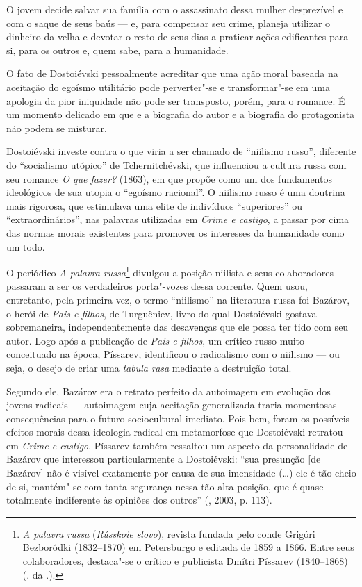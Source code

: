 {{O jovem decide salvar sua família com o assassinato dessa mulher
desprezível e com o saque de seus baús --- e, para compensar seu crime,
planeja utilizar o dinheiro da velha e devotar o resto de seus dias a
praticar ações edificantes para si, para os outros e, quem sabe, para a
humanidade.

O fato de Dostoiévski pessoalmente acreditar que uma ação moral baseada
na aceitação do egoísmo utilitário pode perverter"-se e transformar"-se em
uma apologia da pior iniquidade não pode ser transposto, porém, para o
romance. É um momento delicado em que e a biografia do autor e a
biografia do protagonista não podem se misturar.

Dostoiévski investe contra o que viria a ser chamado de ``niilismo
russo'', diferente do ``socialismo utópico'' de Tchernitchévski, que
influenciou a cultura russa com seu romance \emph{O que fazer?} (1863),
em que propõe como um dos fundamentos ideológicos de sua utopia o
``egoísmo racional''. O niilismo russo é uma doutrina mais rigorosa, que
estimulava uma elite de indivíduos ``superiores'' ou
``extraordinários'', nas palavras utilizadas em \emph{Crime e castigo},
a passar por cima das normas morais existentes para promover os
interesses da humanidade como um todo.

O periódico \emph{A palavra russa}\footnote{\emph{A palavra russa}
  (\emph{Rússkoie slovo}), revista fundada pelo conde Grigóri Bezboródki
  (1832--1870) em Petersburgo e editada de 1859 a 1866. Entre seus
  colaboradores, destaca"-se o crítico e publicista Dmítri Píssarev
  (1840--1868) (. da .).} divulgou a posição niilista e seus
colaboradores passaram a ser os verdadeiros porta"-vozes dessa corrente.
Quem usou, entretanto, pela primeira vez, o termo ``niilismo'' na
literatura russa foi Bazárov, o herói de \emph{Pais e filhos}, de
Turguêniev, livro do qual Dostoiévski gostava sobremaneira,
independentemente das desavenças que ele possa ter tido com seu autor.
Logo após a publicação de \emph{Pais e filhos}, um crítico russo muito
conceituado na época, Píssarev, identificou o radicalismo com o niilismo
--- ou seja, o desejo de criar uma \emph{tabula rasa} mediante a
destruição total.

Segundo ele, Bazárov era o retrato perfeito da autoimagem em evolução
dos jovens radicais --- autoimagem cuja aceitação generalizada traria
momentosas consequências para o futuro sociocultural imediato. Pois bem,
foram os possíveis efeitos morais dessa ideologia radical em metamorfose
que Dostoiévski retratou em \emph{Crime e castigo}. Píssarev também
ressaltou um aspecto da personalidade de Bazárov que interessou
particularmente a Dostoiévski: ``sua presunção [de Bazárov] não é
visível exatamente por causa de sua imensidade (\ldots{}) ele é tão cheio de
si, mantém"-se com tanta segurança nessa tão alta posição, que é quase
totalmente indiferente às opiniões dos outros'' (, 2003, p. 113).

}}
